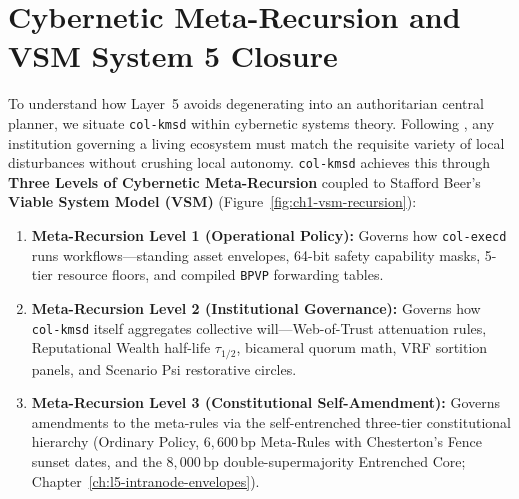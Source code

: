 \section{Cybernetic Meta-Recursion and VSM System 5 Closure}
\label{sec:ch1-vsm-system5}

To understand how Layer~5 avoids degenerating into an authoritarian central planner, we situate
\texttt{col-kmsd} within cybernetic systems theory. Following \textcite{ashby1956}, any
institution governing a living ecosystem must match the requisite variety of local disturbances
without crushing local autonomy. \texttt{col-kmsd} achieves this through \textbf{Three Levels of
Cybernetic Meta-Recursion} coupled to Stafford Beer's \textbf{Viable System Model (VSM)}
\parencite{beer1972,beer1974,beer1979} (Figure~\ref{fig:ch1-vsm-recursion}):

\begin{enumerate}
\item \textbf{Meta-Recursion Level 1 (Operational Policy):} Governs how \texttt{col-execd} runs
        workflows---standing asset envelopes, 64-bit safety capability masks, 5-tier resource
        floors, and compiled \texttt{BPVP} forwarding tables.
\item \textbf{Meta-Recursion Level 2 (Institutional Governance):} Governs how \texttt{col-kmsd}
        itself aggregates collective will---Web-of-Trust attenuation rules, Reputational Wealth
        half-life $\tau_{1/2}$, bicameral quorum math, VRF sortition panels, and Scenario Psi
        restorative circles.
\item \textbf{Meta-Recursion Level 3 (Constitutional Self-Amendment):} Governs amendments to
        the meta-rules via the self-entrenched three-tier constitutional hierarchy (Ordinary
        Policy, $6{,}600\,\mathrm{bp}$ Meta-Rules with Chesterton's Fence sunset dates, and the
        $8{,}000\,\mathrm{bp}$ double-supermajority Entrenched Core; Chapter~\ref{ch:l5-intranode-envelopes}).
\end{enumerate}

